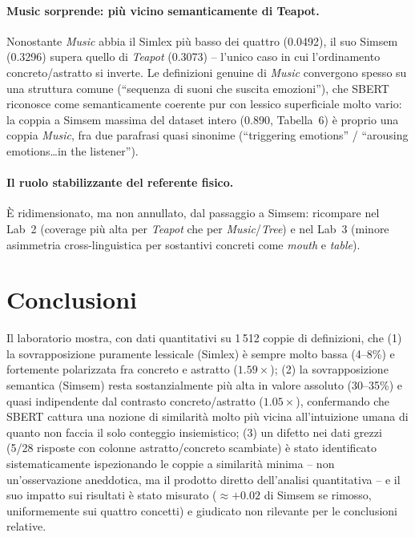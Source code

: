 \documentclass[12pt,a4paper]{article}
\begin{document}
\paragraph{Music sorprende: pi\`u vicino semanticamente di Teapot.} Nonostante \textit{Music} abbia il Simlex pi\`u basso dei quattro (0.0492), il suo Simsem (0.3296) supera quello di \textit{Teapot} (0.3073) -- l'unico caso in cui l'ordinamento concreto/astratto si inverte. Le definizioni genuine di \textit{Music} convergono spesso su una struttura comune (``sequenza di suoni che suscita emozioni''), che SBERT riconosce come semanticamente coerente pur con lessico superficiale molto vario: la coppia a Simsem massima del dataset intero (0.890, Tabella~6) \`e proprio una coppia \textit{Music}, fra due parafrasi quasi sinonime (``triggering emotions'' / ``arousing emotions\ldots in the listener'').

\paragraph{Il ruolo stabilizzante del referente fisico.} \`E ridimensionato, ma non annullato, dal passaggio a Simsem: ricompare nel Lab~2 (coverage pi\`u alta per \textit{Teapot} che per \textit{Music}/\textit{Tree}) e nel Lab~3 (minore asimmetria cross-linguistica per sostantivi concreti come \textit{mouth} e \textit{table}).

\section{Conclusioni}

Il laboratorio mostra, con dati quantitativi su 1\,512 coppie di definizioni, che (1) la sovrapposizione puramente lessicale (Simlex) \`e sempre molto bassa (4--8\%) e fortemente polarizzata fra concreto e astratto ($1.59\times$); (2) la sovrapposizione semantica (Simsem) resta sostanzialmente pi\`u alta in valore assoluto (30--35\%) e quasi indipendente dal contrasto concreto/astratto ($1.05\times$), confermando che SBERT cattura una nozione di similarit\`a molto pi\`u vicina all'intuizione umana di quanto non faccia il solo conteggio insiemistico; (3) un difetto nei dati grezzi (5/28 risposte con colonne astratto/concreto scambiate) \`e stato identificato sistematicamente ispezionando le coppie a similarit\`a minima -- non un'osservazione aneddotica, ma il prodotto diretto dell'analisi quantitativa -- e il suo impatto sui risultati \`e stato misurato ($\approx +0.02$ di Simsem se rimosso, uniformemente sui quattro concetti) e giudicato non rilevante per le conclusioni relative.
\end{document}
